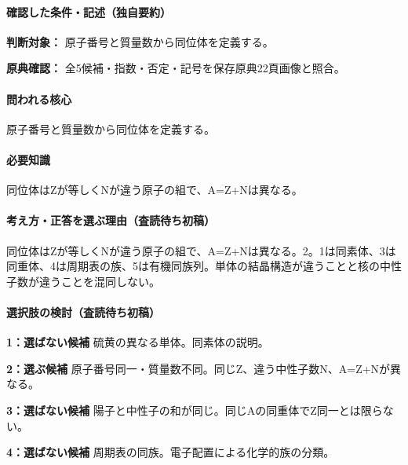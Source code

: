 \paragraph{確認した条件・記述（独自要約）}\mbox{}\par

\noindent\textbf{判断対象：} 原子番号と質量数から同位体を定義する。\par

\noindent\textbf{原典確認：} 全5候補・指数・否定・記号を保存原典22頁画像と照合。\par

\paragraph{問われる核心} 原子番号と質量数から同位体を定義する。

\paragraph{必要知識} 同位体はZが等しくNが違う原子の組で、A=\allowbreak{}Z+Nは異なる。

\paragraph{考え方・正答を選ぶ理由（査読待ち初稿）} 同位体はZが等しくNが違う原子の組で、A=\allowbreak{}Z+Nは異なる。2。1は同素体、3は同重体、4は周期表の族、5は有機同族列。単体の結晶構造が違うことと核の中性子数が違うことを混同しない。

\paragraph{選択肢の検討（査読待ち初稿）}\mbox{}\par

\noindent\textbf{1：選ばない候補} 硫黄の異なる単体。同素体の説明。\par

\noindent\textbf{2：選ぶ候補} 原子番号同一・質量数不同。同じZ、違う中性子数N、A=\allowbreak{}Z+Nが異なる。\par

\noindent\textbf{3：選ばない候補} 陽子と中性子の和が同じ。同じAの同重体でZ同一とは限らない。\par

\noindent\textbf{4：選ばない候補} 周期表の同族。電子配置による化学的族の分類。\par

